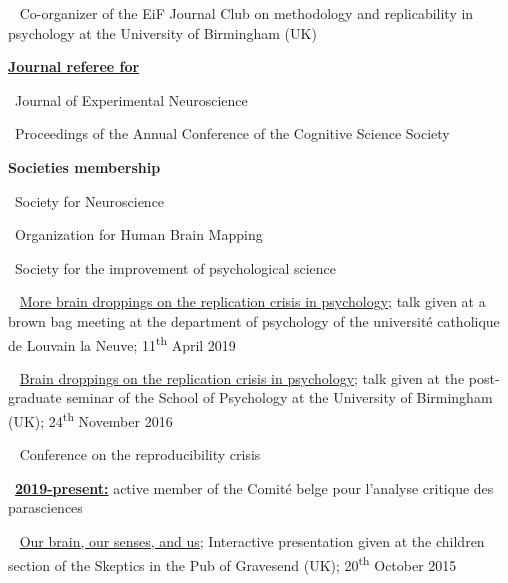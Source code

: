 


\textbullet~ Co-organizer of the EiF Journal Club on methodology and replicability in psychology at the University of Birmingham (UK)


\href{http://publons.com/author/1205193/remi-gau#profile}{\textbf{Journal referee for}}

\textbullet~Journal of Experimental Neuroscience

\textbullet~Proceedings of the Annual Conference of the Cognitive Science Society


\textbf{Societies membership}

\textbullet~Society for Neuroscience

\textbullet~Organization for Human Brain Mapping

\textbullet~Society for the improvement of psychological science



\textbullet~ \href{https://osf.io/vu327/}{More brain droppings on the replication crisis in psychology}; 
talk given at a brown bag meeting at the department of psychology of the université catholique de Louvain la Neuve; 
11\textsuperscript{th} April 2019

\textbullet~ \href{https://dx.doi.org/10.6084/m9.figshare.4257992.v1}{Brain droppings on the replication crisis in psychology}; talk given at the post-graduate seminar of the School of Psychology at the University of Birmingham (UK); 
24\textsuperscript{th} November 2016



\textbullet~ Conference on the reproducibility crisis

\textbullet~\underline{\textbf{2019-present:}} active member of the Comité belge pour l'analyse critique des parasciences

\textbullet~ \href{https://dx.doi.org/10.6084/m9.figshare.4535423.v1}{Our brain, our senses, and us}; Interactive presentation given at the children section of the Skeptics in the Pub of Gravesend (UK); 20\textsuperscript{th} October 2015

